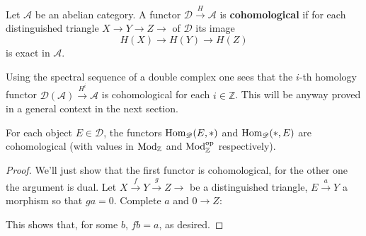 \begin{defn}
Let $\mathscr{A}$ be an abelian category. A functor $\mathscr{D} \overset{H}{\longrightarrow} \mathscr{A}$ is \textbf{cohomological} if for each distinguished triangle $X \longrightarrow Y \longrightarrow Z \longrightarrow$ of $\mathscr{D}$ its image $$H(X) \longrightarrow H(Y) \longrightarrow H(Z)$$ 
is exact in $\mathscr{A}$. 
\end{defn}

\begin{exmp}
Using the spectral sequence of a double complex one sees that the $i$-th homology functor $\mathscr{D}(\mathscr{A}) \overset{H^i}{\longrightarrow} \mathscr{A}$ is cohomological for each $i \in \mathbb{Z}$. This will be anyway proved in a general context in the next section. 
\end{exmp}

\begin{prop}
For each object $E \in \mathscr{D}$, the functors $\textnormal{Hom}_{\mathscr{D}}(E, *)$ and $\textnormal{Hom}_{\mathscr{D}}(*,E)$ are cohomological (with values in $\textnormal{Mod}_{\mathbb{Z}}$ and $\textnormal{Mod}^{\textnormal{op}}_{\mathbb{Z}}$ respectively). 
\end{prop}

\begin{proof}
We'll just show that the first functor is cohomological, for the other one the argument is dual. Let $X \overset{f}{\longrightarrow} Y \overset{g}{\longrightarrow} Z \longrightarrow$ be a distinguished triangle, $E \overset{a}{\longrightarrow} Y$ a morphism so that $ga=0$. Complete $a$ and $0 \longrightarrow Z$: 
\begin{center}
\end{center}
This shows that, for some $b$, $fb=a$, as desired. 
\end{proof}

